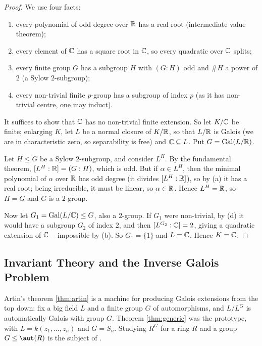 \documentclass[a4paper]{scrartcl}
\newcommand{\Gal}{\operatorname{Gal}}
\begin{document}
\begin{proof}
	We use four facts:
	\begin{enumerate}[label=(\alph*)]
		\item every polynomial of odd degree over $\mathbb{R}$ has a real root (intermediate value theorem);
		\item every element of $\mathbb{C}$ has a square root in $\mathbb{C}$, so every quadratic over $\mathbb{C}$ splits;
		\item every finite group $G$ has a subgroup $H$ with $(G:H)$ odd and $\#H$ a power of $2$ (a Sylow $2$-subgroup);
		\item every non-trivial finite $p$-group has a subgroup of index $p$ (as it has non-trivial centre, one may induct).
	\end{enumerate}

	It suffices to show that $\mathbb{C}$ has no non-trivial finite extension. So let $K/\mathbb{C}$ be finite; enlarging $K$, let $L$ be a normal closure of $K/\mathbb{R}$, so that $L/\mathbb{R}$ is Galois (we are in characteristic zero, so separability is free) and $\mathbb{C} \subseteq L$. Put $G = \Gal(L/\R)$.

	Let $H \leq G$ be a Sylow $2$-subgroup, and consider $L^H$. By the fundamental theorem, $[L^H:\mathbb{R}] = (G:H)$, which is odd. But if $\alpha \in L^H$, then the minimal polynomial of $\alpha$ over $\mathbb{R}$ has odd degree (it divides $[L^H : \mathbb{R}]$), so by (a) it has a real root; being irreducible, it must be linear, so $\alpha \in \mathbb{R}$. Hence $L^H = \mathbb{R}$, so $H = G$ and $G$ is a $2$-group.

	Now let $G_1 = \Gal(L/\C) \leq G$, also a $2$-group. If $G_1$ were non-trivial, by (d) it would have a subgroup $G_2$ of index $2$, and then $[L^{G_2}:\mathbb{C}] = 2$, giving a quadratic extension of $\mathbb{C}$ -- impossible by (b). So $G_1 = \{1\}$ and $L = \mathbb{C}$. Hence $K = \mathbb{C}$.
\end{proof}

\subsection{Invariant Theory and the Inverse Galois Problem}

Artin's theorem \ref{thm:artin} is a machine for producing Galois extensions from the top down: fix a big field $L$ and a finite group $G$ of automorphisms, and $L/L^G$ is automatically Galois with group $G$. Theorem \ref{thm:generic} was the prototype, with $L = k(z_1,\dots,z_n)$ and $G = S_n$. Studying $R^G$ for a ring $R$ and a group $G \leq \aut(R)$ is the subject of .
\end{document}
